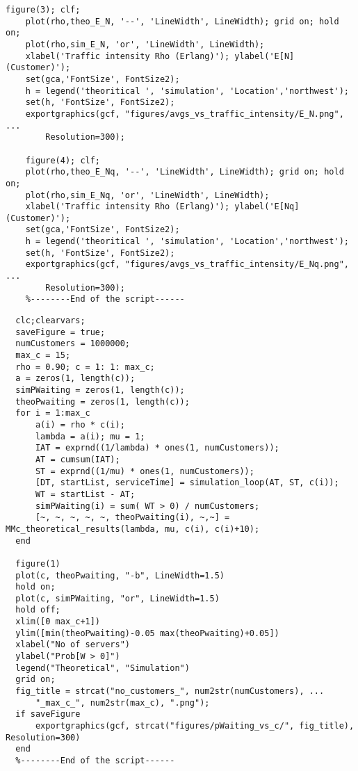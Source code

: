 \begin{lstlisting}[style=Matlab-editor, basicstyle=\ttfamily\footnotesize]
    figure(3); clf;
    plot(rho,theo_E_N, '--', 'LineWidth', LineWidth); grid on; hold on;
    plot(rho,sim_E_N, 'or', 'LineWidth', LineWidth);
    xlabel('Traffic intensity Rho (Erlang)'); ylabel('E[N] (Customer)');
    set(gca,'FontSize', FontSize2);
    h = legend('theoritical ', 'simulation', 'Location','northwest');
    set(h, 'FontSize', FontSize2);
    exportgraphics(gcf, "figures/avgs_vs_traffic_intensity/E_N.png", ...
        Resolution=300);
    
    figure(4); clf;
    plot(rho,theo_E_Nq, '--', 'LineWidth', LineWidth); grid on; hold on;
    plot(rho,sim_E_Nq, 'or', 'LineWidth', LineWidth);
    xlabel('Traffic intensity Rho (Erlang)'); ylabel('E[Nq] (Customer)');
    set(gca,'FontSize', FontSize2);
    h = legend('theoritical ', 'simulation', 'Location','northwest');
    set(h, 'FontSize', FontSize2);
    exportgraphics(gcf, "figures/avgs_vs_traffic_intensity/E_Nq.png", ...
        Resolution=300);
    %--------End of the script------
  \end{lstlisting}
  
  \begin{lstlisting}[style=Matlab-editor, basicstyle=\ttfamily\footnotesize]
  %script for simulating and plotting Prob[W > 0] vs c
  clc;clearvars;
  saveFigure = true;
  numCustomers = 1000000;
  max_c = 15;
  rho = 0.90; c = 1: 1: max_c;
  a = zeros(1, length(c));
  simPWaiting = zeros(1, length(c));
  theoPwaiting = zeros(1, length(c));
  for i = 1:max_c
      a(i) = rho * c(i);
      lambda = a(i); mu = 1;
      IAT = exprnd((1/lambda) * ones(1, numCustomers));
      AT = cumsum(IAT);
      ST = exprnd((1/mu) * ones(1, numCustomers));
      [DT, startList, serviceTime] = simulation_loop(AT, ST, c(i));
      WT = startList - AT;
      simPWaiting(i) = sum( WT > 0) / numCustomers;
      [~, ~, ~, ~, ~, theoPwaiting(i), ~,~] = MMc_theoretical_results(lambda, mu, c(i), c(i)+10);
  end 
  
  figure(1)
  plot(c, theoPwaiting, "-b", LineWidth=1.5)
  hold on;
  plot(c, simPWaiting, "or", LineWidth=1.5)
  hold off;
  xlim([0 max_c+1])
  ylim([min(theoPwaiting)-0.05 max(theoPwaiting)+0.05])
  xlabel("No of servers")
  ylabel("Prob[W > 0]")
  legend("Theoretical", "Simulation")
  grid on;
  fig_title = strcat("no_customers_", num2str(numCustomers), ...
      "_max_c_", num2str(max_c), ".png");
  if saveFigure
      exportgraphics(gcf, strcat("figures/pWaiting_vs_c/", fig_title), Resolution=300)
  end
  %--------End of the script------
  \end{lstlisting}